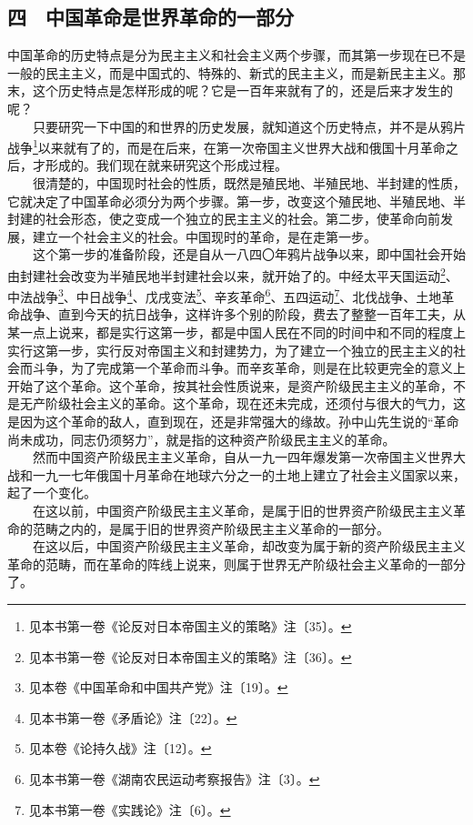 \documentclass[cn,11pt,chinese]{elegantbook}
\def\myformat#1{\hfil\hfil #1}
\begin{document}
\subsection*{\myformat{四　中国革命是世界革命的一部分}}
中国革命的历史特点是分为民主主义和社会主义两个步骤，而其第一步现在已不是一般的民主主义，而是中国式的、特殊的、新式的民主主义，而是新民主主义。那末，这个历史特点是怎样形成的呢？它是一百年来就有了的，还是后来才发生的呢？\\
　　只要研究一下中国的和世界的历史发展，就知道这个历史特点，并不是从鸦片战争\footnote[5]{ 见本书第一卷《论反对日本帝国主义的策略》注〔35〕。}以来就有了的，而是在后来，在第一次帝国主义世界大战和俄国十月革命之后，才形成的。我们现在就来研究这个形成过程。\\
　　很清楚的，中国现时社会的性质，既然是殖民地、半殖民地、半封建的性质，它就决定了中国革命必须分为两个步骤。第一步，改变这个殖民地、半殖民地、半封建的社会形态，使之变成一个独立的民主主义的社会。第二步，使革命向前发展，建立一个社会主义的社会。中国现时的革命，是在走第一步。\\
　　这个第一步的准备阶段，还是自从一八四〇年鸦片战争以来，即中国社会开始由封建社会改变为半殖民地半封建社会以来，就开始了的。中经太平天国运动\footnote[6]{ 见本书第一卷《论反对日本帝国主义的策略》注〔36〕。}、中法战争\footnote[7]{ 见本卷《中国革命和中国共产党》注〔19〕。}、中日战争\footnote[8]{ 见本书第一卷《矛盾论》注〔22〕。}、戊戌变法\footnote[9]{ 见本卷《论持久战》注〔12〕。}、辛亥革命\footnote[10]{ 见本书第一卷《湖南农民运动考察报告》注〔3〕。}、五四运动\footnote[11]{ 见本书第一卷《实践论》注〔6〕。}、北伐战争、土地革命战争、直到今天的抗日战争，这样许多个别的阶段，费去了整整一百年工夫，从某一点上说来，都是实行这第一步，都是中国人民在不同的时间中和不同的程度上实行这第一步，实行反对帝国主义和封建势力，为了建立一个独立的民主主义的社会而斗争，为了完成第一个革命而斗争。而辛亥革命，则是在比较更完全的意义上开始了这个革命。这个革命，按其社会性质说来，是资产阶级民主主义的革命，不是无产阶级社会主义的革命。这个革命，现在还未完成，还须付与很大的气力，这是因为这个革命的敌人，直到现在，还是非常强大的缘故。孙中山先生说的“革命尚未成功，同志仍须努力”，就是指的这种资产阶级民主主义的革命。\\
　　然而中国资产阶级民主主义革命，自从一九一四年爆发第一次帝国主义世界大战和一九一七年俄国十月革命在地球六分之一的土地上建立了社会主义国家以来，起了一个变化。\\
　　在这以前，中国资产阶级民主主义革命，是属于旧的世界资产阶级民主主义革命的范畴之内的，是属于旧的世界资产阶级民主主义革命的一部分。\\
　　在这以后，中国资产阶级民主主义革命，却改变为属于新的资产阶级民主主义革命的范畴，而在革命的阵线上说来，则属于世界无产阶级社会主义革命的一部分了。\\
\end{document}
